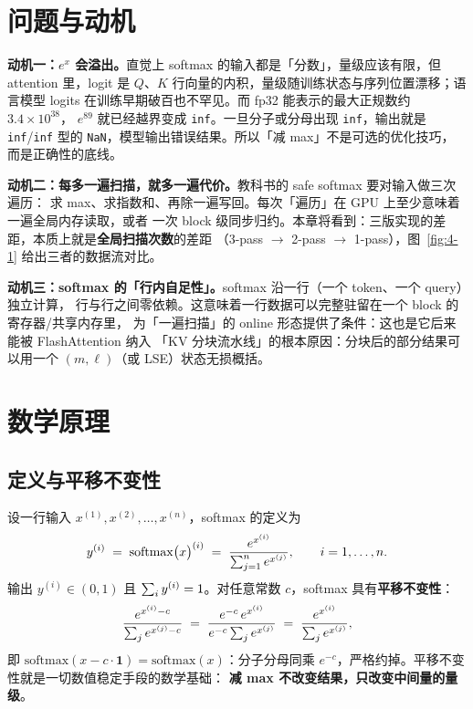 \section{问题与动机}

\textbf{动机一：$e^{x}$ 会溢出。}直觉上 softmax 的输入都是「分数」，量级应该有限，但
attention 里，logit 是 $Q$、$K$ 行向量的内积，量级随训练状态与序列位置漂移；语言模型
logits 在训练早期破百也不罕见。而 fp32 能表示的最大正规数约 $3.4\times 10^{38}$，
$e^{89}$ 就已经越界变成 \texttt{inf}。一旦分子或分母出现 \texttt{inf}，输出就是
\texttt{inf}/\texttt{inf} 型的 \texttt{NaN}，模型输出错误结果。所以「减 max」不是可选的优化技巧，
而是正确性的底线。

\textbf{动机二：每多一遍扫描，就多一遍代价。}教科书的 safe softmax 要对输入做三次遍历：
求 max、求指数和、再除一遍写回。每次「遍历」在 GPU 上至少意味着一遍全局内存读取，或者
一次 block 级同步归约。本章将看到：三版实现的差距，本质上就是\textbf{全局扫描次数}的差距
（3-pass $\to$ 2-pass $\to$ 1-pass），图~\ref{fig:4-1} 给出三者的数据流对比。

\textbf{动机三：softmax 的「行内自足性」。}\allowbreak{}softmax 沿一行（一个 token、一个 query）独立计算，
行与行之间零依赖。这意味着一行数据可以完整驻留在一个 block 的寄存器/共享内存里，
为「一遍扫描」的 online 形态提供了条件：这也是它后来能被 FlashAttention 纳入
「KV 分块流水线」的根本原因：分块后的部分结果可以用一个 $(m,\ell)$（或 LSE）状态无损概括。

\section{数学原理}

\subsection{定义与平移不变性}

设一行输入 $x^{(1)}, x^{(2)}, \dots, x^{(n)}$，softmax 的定义为
\begin{equation}
  y^{(i)} \;=\; \mathrm{softmax}\bigl(x\bigr)^{(i)}
  \;=\; \frac{e^{x^{(i)}}}{\sum\sb{j=1}^{n} e^{x^{(j)}}},
  \qquad i = 1, \dots, n .
  \label{eq:4-softmax-def}
\end{equation}
输出 $y^{(i)} \in (0,1)$ 且 $\sum\sb{i} y^{(i)} = 1$。对任意常数 $c$，softmax 具有\textbf{平移不变性}：
\begin{equation}
  \frac{e^{x^{(i)} - c}}{\sum\sb{j} e^{x^{(j)} - c}}
  \;=\; \frac{e^{-c}\, e^{x^{(i)}}}{e^{-c} \sum\sb{j} e^{x^{(j)}}}
  \;=\; \frac{e^{x^{(i)}}}{\sum\sb{j} e^{x^{(j)}}} ,
  \label{eq:4-shift}
\end{equation}
即 $\mathrm{softmax}(x - c\cdot \mathbf{1}) = \mathrm{softmax}(x)$：分子分母同乘
$e^{-c}$，严格约掉。平移不变性就是一切数值稳定手段的数学基础：
\textbf{减 max 不改变结果，只改变中间量的量级}。

